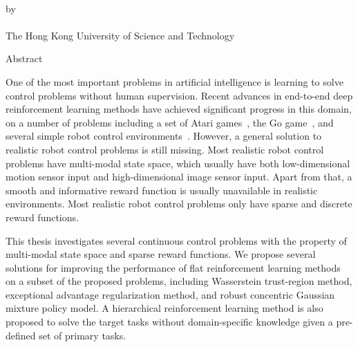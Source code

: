 \begin{center}
{\Large \thesistitle}\\
\vspace{20mm}
by \thesisauthor\\
\vspace{15mm}
\departmentname\\
\vspace{10mm}
The Hong Kong University of Science and Technology
\end{center}
\vspace{8mm}
\begin{center}
Abstract
\end{center}
One of the most important problems in artificial intelligence is learning to solve control problems without human supervision. Recent advances in end-to-end deep reinforcement learning methods have achieved significant progress in this domain, on a number of problems including a set of Atari games~\cite{mnih2015human}, the Go game~\cite{silver2016mastering}, and several simple robot control environments~\cite{duan2016benchmarking}.  However, a general solution to realistic robot control problems is still missing. Most realistic robot control problems have multi-modal state space, which usually have both low-dimensional motion sensor input and high-dimensional image sensor input. Apart from that, a smooth and informative reward function is usually unavailable in realistic environments. Most realistic robot control problems only have sparse and discrete reward functions.

This thesis investigates several continuous control problems with the property of multi-modal state space and sparse reward functions. We propose several solutions for improving the performance of flat reinforcement learning methods on a subset of the proposed problems, including Wasserstein trust-region method, exceptional advantage regularization method, and robust concentric Gaussian mixture policy model. A hierarchical reinforcement learning method is also proposed to solve the target tasks without domain-specific knowledge given a pre-defined set of primary tasks. 

\par
\noindent


